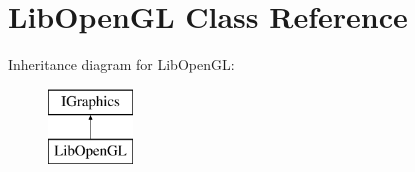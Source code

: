\hypertarget{class_lib_open_g_l}{}\section{Lib\+Open\+GL Class Reference}
\label{class_lib_open_g_l}
Inheritance diagram for Lib\+Open\+GL\+:\begin{figure}[H]
\begin{center}
\leavevmode
\includegraphics[height=2.000000cm]{class_lib_open_g_l}
\end{center}
\end{figure}
